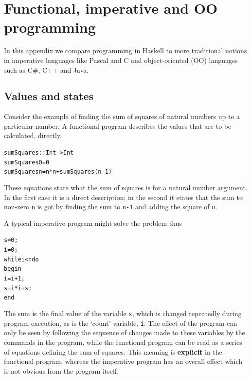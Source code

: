 

\chapter{Functional, imperative and OO programming}
\label{vs}

In this appendix we compare programming in Haskell to more traditional
notions in imperative languages like Pascal and C and object-oriented
(OO)
languages such as C\#, C++ and Java.

\section*{Values and states}

Consider the example of finding the sum of squares
of natural numbers up to a particular number. 
A functional program describes the values that are to be calculated, directly. 
\begin{alltt}
sumSquares :: Int -> Int
sumSquares 0 = 0
sumSquares n = n*n + sumSquares (n-1)
\end{alltt}
These equations state what the sum of squares is for a natural number
argument. In the first case it
is a direct description; in the second it states that the sum to non-zero
\texttt{n} is
got by finding the sum to \texttt{n-1} and adding the square of \texttt{n}.

A typical imperative program might solve the problem thus
\begin{alltt}
s = 0 ;
i = 0 ;
while i<n do 
  begin
    i = i+1 ;
    s = i*i + s ;
  end 
\end{alltt}
The sum is the final value of the variable \texttt{s}, which is changed repeatedly
during program execution, as is the `count' variable, \texttt{i}.
The effect of the program can only be seen by following the  sequence of changes
made to these variables by the commands in the program, while  the
functional program can be read as a series of equations defining the sum of squares. This meaning is \textbf{explicit} in the functional program, whereas the imperative program has an overall effect which is not obvious from the program itself. 


